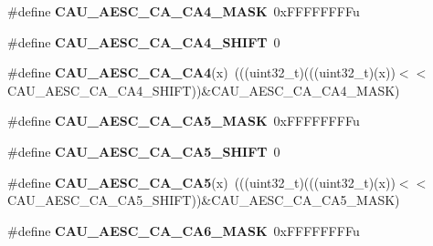 \begin{DoxyCompactItemize}
\item 
\#define {\bfseries C\+A\+U\+\_\+\+A\+E\+S\+C\+\_\+\+C\+A\+\_\+\+C\+A4\+\_\+\+M\+A\+SK}~0x\+F\+F\+F\+F\+F\+F\+F\+Fu\hypertarget{group__CAU__Register__Masks_ga19b50ba9810cc4a1ebd860aba00dd728}{}\label{group__CAU__Register__Masks_ga19b50ba9810cc4a1ebd860aba00dd728}

\item 
\#define {\bfseries C\+A\+U\+\_\+\+A\+E\+S\+C\+\_\+\+C\+A\+\_\+\+C\+A4\+\_\+\+S\+H\+I\+FT}~0\hypertarget{group__CAU__Register__Masks_ga67414b23056892843c13aaed39303c4d}{}\label{group__CAU__Register__Masks_ga67414b23056892843c13aaed39303c4d}

\item 
\#define {\bfseries C\+A\+U\+\_\+\+A\+E\+S\+C\+\_\+\+C\+A\+\_\+\+C\+A4}(x)~(((uint32\+\_\+t)(((uint32\+\_\+t)(x))$<$$<$C\+A\+U\+\_\+\+A\+E\+S\+C\+\_\+\+C\+A\+\_\+\+C\+A4\+\_\+\+S\+H\+I\+FT))\&C\+A\+U\+\_\+\+A\+E\+S\+C\+\_\+\+C\+A\+\_\+\+C\+A4\+\_\+\+M\+A\+SK)\hypertarget{group__CAU__Register__Masks_ga0f48fe60e6b2d475dbe6c67cd0947f5f}{}\label{group__CAU__Register__Masks_ga0f48fe60e6b2d475dbe6c67cd0947f5f}

\item 
\#define {\bfseries C\+A\+U\+\_\+\+A\+E\+S\+C\+\_\+\+C\+A\+\_\+\+C\+A5\+\_\+\+M\+A\+SK}~0x\+F\+F\+F\+F\+F\+F\+F\+Fu\hypertarget{group__CAU__Register__Masks_ga0368b4a75631ad41f0d262ea1f42f285}{}\label{group__CAU__Register__Masks_ga0368b4a75631ad41f0d262ea1f42f285}

\item 
\#define {\bfseries C\+A\+U\+\_\+\+A\+E\+S\+C\+\_\+\+C\+A\+\_\+\+C\+A5\+\_\+\+S\+H\+I\+FT}~0\hypertarget{group__CAU__Register__Masks_ga4412c36bceb81d934b45def23cb28554}{}\label{group__CAU__Register__Masks_ga4412c36bceb81d934b45def23cb28554}

\item 
\#define {\bfseries C\+A\+U\+\_\+\+A\+E\+S\+C\+\_\+\+C\+A\+\_\+\+C\+A5}(x)~(((uint32\+\_\+t)(((uint32\+\_\+t)(x))$<$$<$C\+A\+U\+\_\+\+A\+E\+S\+C\+\_\+\+C\+A\+\_\+\+C\+A5\+\_\+\+S\+H\+I\+FT))\&C\+A\+U\+\_\+\+A\+E\+S\+C\+\_\+\+C\+A\+\_\+\+C\+A5\+\_\+\+M\+A\+SK)\hypertarget{group__CAU__Register__Masks_gacebcc2eb3e9ab2e135cf3b461fb9956b}{}\label{group__CAU__Register__Masks_gacebcc2eb3e9ab2e135cf3b461fb9956b}

\item 
\#define {\bfseries C\+A\+U\+\_\+\+A\+E\+S\+C\+\_\+\+C\+A\+\_\+\+C\+A6\+\_\+\+M\+A\+SK}~0x\+F\+F\+F\+F\+F\+F\+F\+Fu\hypertarget{group__CAU__Register__Masks_ga12df900e0ab49a2eb0e596f184a22d02}{}\label{group__CAU__Register__Masks_ga12df900e0ab49a2eb0e596f184a22d02}


\end{DoxyCompactItemize}
